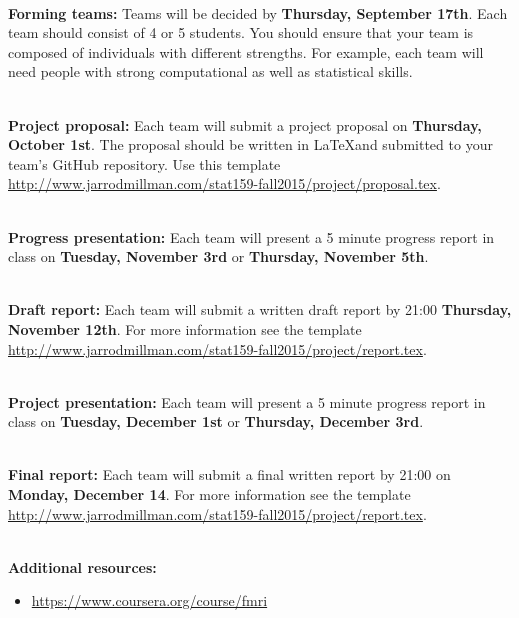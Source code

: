 \documentclass[11pt]{article}
\begin{document}
\textbf {\large \\ Forming teams:}
Teams will be decided by \textbf{Thursday, September 17th}.  Each team
should consist of 4 or 5 students.  You should ensure that your team
is composed of individuals with different strengths.  For example, each team
will need people with strong computational as well as statistical skills.

\textbf {\large \\ Project proposal:}
Each team will submit a project proposal on \textbf{Thursday, October
1st}.  The proposal should be written in \LaTeX and submitted to your team's
GitHub repository.  Use this template
\url{http://www.jarrodmillman.com/stat159-fall2015/project/proposal.tex}.

\textbf {\large \\ Progress presentation:}
Each team will present a 5 minute progress report in class
on \textbf{Tuesday, November 3rd} or \textbf{Thursday,  November 5th}.

\textbf {\large \\ Draft report:}
Each team will submit a written draft report by 21:00 \textbf{Thursday,
November 12th}.  For more information see the template
\url{http://www.jarrodmillman.com/stat159-fall2015/project/report.tex}.

\textbf {\large \\ Project presentation:}
Each team will present a 5 minute progress report in class
on \textbf{Tuesday, December 1st} or \textbf{Thursday, December 3rd}.

\textbf {\large \\ Final report:}
Each team will submit a final written report by 21:00 on
\textbf{Monday, December 14}.  For more information see the
template \url{http://www.jarrodmillman.com/stat159-fall2015/project/report.tex}.

\textbf {\large \\ Additional resources:}

\begin{itemize}
\item \url{https://www.coursera.org/course/fmri}
\end{itemize}
\end{document}
